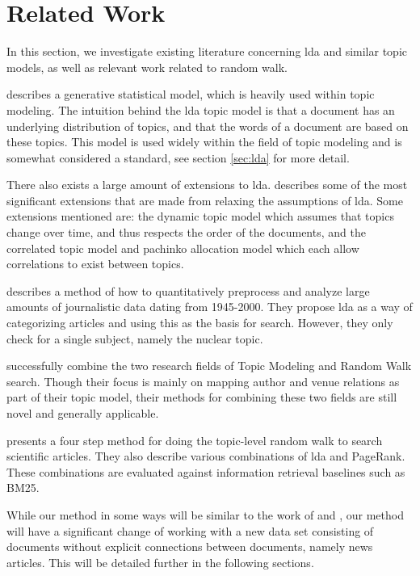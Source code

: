 \section{Related Work}\label{sec:related-works} 
In this section, we investigate existing literature concerning \gls{lda} and similar topic models, as well as relevant work related to random walk.

\citet{lda} describes a generative statistical model, which is heavily used within topic modeling. 
The intuition behind the \gls{lda} topic model is that a document has an underlying distribution of topics, and that the words of a document are based on these topics.
This model is used widely within the field of topic modeling and is somewhat considered a standard, see section \autoref{sec:lda} for more detail.

There also exists a large amount of extensions to \gls{lda}.
\citet{blei2012topicmodels} describes some of the most significant extensions that are made from relaxing the assumptions of \gls{lda}.
Some extensions mentioned are: the dynamic topic model\cite{blei2006dynamic} which assumes that topics change over time, and thus respects the order of the documents, and the correlated topic model\cite{blei2007correlated} and pachinko allocation model\cite{li2006pachinko} which each allow correlations to exist between topics.


\citet{quanti} describes a method of how to quantitatively preprocess and analyze large amounts of journalistic data dating from 1945-2000. 
They propose \gls{lda} as a way of categorizing articles and using this as the basis for search.
However, they only check for a single subject, namely the nuclear topic.  


\citet{Tang2008} successfully combine the two research fields of Topic Modeling and Random Walk search. 
Though their focus is mainly on mapping author and venue relations as part of their topic model, their methods for combining these two fields are still novel and generally applicable.


\citet{yang2009topic} presents a four step method for doing the topic-level random walk to search scientific articles. 
They also describe various combinations of \gls{lda} and PageRank.
These combinations are evaluated against information retrieval baselines such as BM25\cite{bm251996}.


While our method in some ways will be similar to the work of \citeauthor{Tang2008} and \citeauthor{yang2009topic}, our method will have a significant change of working with a new data set consisting of documents without explicit connections between documents, namely news articles.
This will be detailed further in the following sections.

